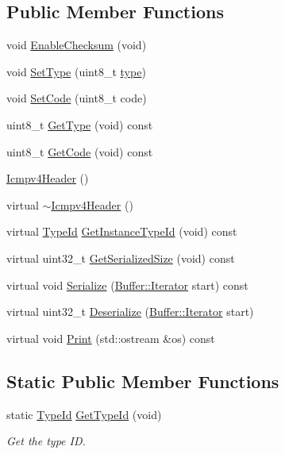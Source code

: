\subsection*{Public Member Functions}
\begin{DoxyCompactItemize}
\item 
void \hyperlink{classns3_1_1Icmpv4Header_ac4b154ae9b6e2a151a2d0f42a491d3b9}{Enable\+Checksum} (void)
\item 
void \hyperlink{classns3_1_1Icmpv4Header_a48c46557787fac004f0de959294ad959}{Set\+Type} (uint8\+\_\+t \hyperlink{visualizer-ideas_8txt_add98db9e15e2a58cf2b57623e7aa893a}{type})
\item 
void \hyperlink{classns3_1_1Icmpv4Header_a283ff70177edcb108317263ba2924a5b}{Set\+Code} (uint8\+\_\+t code)
\item 
uint8\+\_\+t \hyperlink{classns3_1_1Icmpv4Header_a027815e3339ed3463af4458c73f7a6b0}{Get\+Type} (void) const 
\item 
uint8\+\_\+t \hyperlink{classns3_1_1Icmpv4Header_a1106b8dd71a15a305450586e3ecf1032}{Get\+Code} (void) const 
\item 
\hyperlink{classns3_1_1Icmpv4Header_a926419b720f328ecce8b1435ad43bf74}{Icmpv4\+Header} ()
\item 
virtual \hyperlink{classns3_1_1Icmpv4Header_a84fcd638d6024a8a4f4baba8bc08bc44}{$\sim$\+Icmpv4\+Header} ()
\item 
virtual \hyperlink{classns3_1_1TypeId}{Type\+Id} \hyperlink{classns3_1_1Icmpv4Header_a4e860528d37709b05de5e0aeeb9a7213}{Get\+Instance\+Type\+Id} (void) const 
\item 
virtual uint32\+\_\+t \hyperlink{classns3_1_1Icmpv4Header_afe790eeef3bba7f908b0627b390e1793}{Get\+Serialized\+Size} (void) const 
\item 
virtual void \hyperlink{classns3_1_1Icmpv4Header_a8a99d2c9a7cd91e84efbee9a61606ced}{Serialize} (\hyperlink{classns3_1_1Buffer_1_1Iterator}{Buffer\+::\+Iterator} start) const 
\item 
virtual uint32\+\_\+t \hyperlink{classns3_1_1Icmpv4Header_a9993df289cc6aa4b6cf93bb91aa13024}{Deserialize} (\hyperlink{classns3_1_1Buffer_1_1Iterator}{Buffer\+::\+Iterator} start)
\item 
virtual void \hyperlink{classns3_1_1Icmpv4Header_ad212c6e687eea4ab327b941441c89e49}{Print} (std\+::ostream \&os) const 
\end{DoxyCompactItemize}
\subsection*{Static Public Member Functions}
\begin{DoxyCompactItemize}
\item 
static \hyperlink{classns3_1_1TypeId}{Type\+Id} \hyperlink{classns3_1_1Icmpv4Header_aa62d1602e42eb3a620271192a3ca7710}{Get\+Type\+Id} (void)
\begin{DoxyCompactList}\small\item\em Get the type ID. \end{DoxyCompactList}\end{DoxyCompactItemize}
